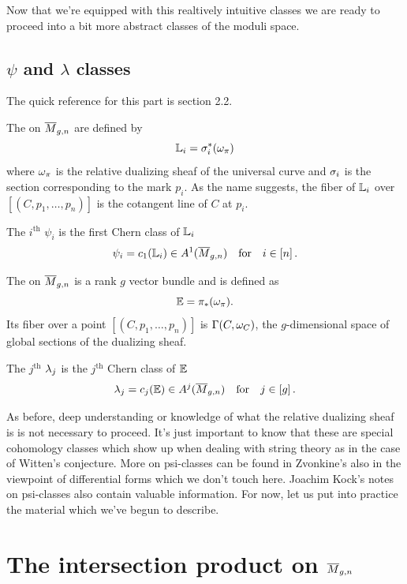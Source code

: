 \documentclass[12pt]{memoir}
\begin{document}
Now that we're equipped with this realtively intuitive classes we are ready to proceed into a bit more abstract classes of the moduli space.

\subsection{$\psi$ and $\lambda$ classes}

The quick reference for this part is \cite{cavalieri2022pseudostablehodgeintegrals} section 2.2. 

\begin{Def}
    The  on $\overline M_{g,n}$ are defined by 
    $$\mathbb{L}_i=\sigma_i^\ast(\omega_\pi)$$
    where $\omega_\pi$ is the relative dualizing sheaf of the universal curve and $\sigma_i$ is the section corresponding to the mark $p_i$. As the name suggests, the fiber of $\mathbb{L}_i$ over $[(C,p_1,\dots,p_n)]$ is the cotangent line of $C$ at $p_i$.\par
    The $i^{\text{th}}$  $\psi_i$ is the first Chern class of $\mathbb{L}_i$
    $$\psi_i=c_1(\mathbb{L}_i)\in A^1(\overline M_{g,n})\quad\text{for}\quad i\in\left\lbrack n\right\rbrack.$$
\end{Def}

\begin{Def}
    The  on $\overline M_{g,n}$ is a rank $g$ vector bundle and is defined as 
    $$\mathbb{E}=\pi_\ast(\omega_\pi).$$
    Its fiber over a point $[(C,p_1,\dots,p_n)]$ is $\Gamma(C,\omega_C)$, the $g$-dimensional space of global sections of the dualizing sheaf.\par
    The $j^{\text{th}}$  $\lambda_j$ is the $j^{\text{th}}$ Chern class of $\mathbb{E}$
    $$\lambda_j=c_j(\mathbb{E})\in A^j(\overline M_{g,n})\quad\text{for}\quad j\in\left\lbrack g\right\rbrack.$$
\end{Def}

As before, deep understanding or knowledge of what the relative dualizing sheaf is is not necessary to proceed. It's just important to know that these are special cohomology classes which show up when dealing with string theory as in the case of Witten's conjecture. More on psi-classes can be found in Zvonkine's \cite{ZvonkineIntro} also in the viewpoint of differential forms which we don't touch here. Joachim Kock's notes on psi-classes also contain valuable information. For now, let us put into practice the material which we've begun to describe. 

\section{The intersection product on $\overline M_{g,n}$}
\end{document}
